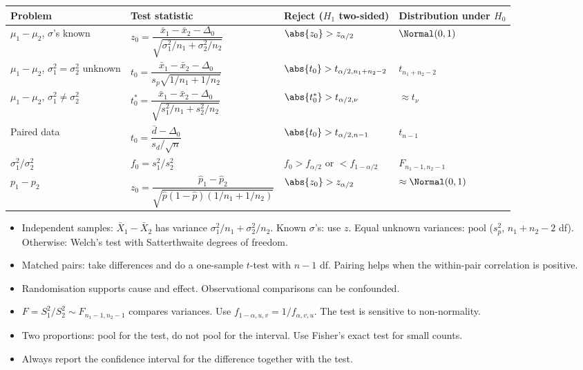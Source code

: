 \begin{center}
\small
\begin{tabular}{p{3.1cm}p{3.6cm}p{3.8cm}p{3.0cm}}
\toprule
Problem & Test statistic & Reject ($H_1$ two-sided) & Distribution under $H_0$ \\
\midrule
$\mu_1-\mu_2$, $\sigma$'s known & $z_0=\dfrac{\bar{x}_1-\bar{x}_2-\Delta_0}{\sqrt{\sigma_1^2/n_1+\sigma_2^2/n_2}}$ & $\abs{z_0}>z_{\alpha/2}$ & $\Normal(0,1)$ \\
$\mu_1-\mu_2$, $\sigma_1^2=\sigma_2^2$ unknown & $t_0=\dfrac{\bar{x}_1-\bar{x}_2-\Delta_0}{s_p\sqrt{1/n_1+1/n_2}}$ & $\abs{t_0}>t_{\alpha/2,n_1+n_2-2}$ & $t_{n_1+n_2-2}$ \\
$\mu_1-\mu_2$, $\sigma_1^2\ne\sigma_2^2$ & $t_0^*=\dfrac{\bar{x}_1-\bar{x}_2-\Delta_0}{\sqrt{s_1^2/n_1+s_2^2/n_2}}$ & $\abs{t_0^*}>t_{\alpha/2,\nu}$ & $\approx t_\nu$ \\
Paired data & $t_0=\dfrac{\bar{d}-\Delta_0}{s_d/\sqrt n}$ & $\abs{t_0}>t_{\alpha/2,n-1}$ & $t_{n-1}$ \\
$\sigma_1^2/\sigma_2^2$ & $f_0=s_1^2/s_2^2$ & $f_0>f_{\alpha/2}$ or $<f_{1-\alpha/2}$ & $F_{n_1-1,n_2-1}$ \\
$p_1-p_2$ & $z_0=\dfrac{\hat{p}_1-\hat{p}_2}{\sqrt{\hat{p}(1-\hat{p})(1/n_1+1/n_2)}}$ & $\abs{z_0}>z_{\alpha/2}$ & $\approx\Normal(0,1)$ \\
\bottomrule
\end{tabular}
\end{center}


\begin{summarybox}
\begin{itemize}
  \item Independent samples: $\bar{X}_1-\bar{X}_2$ has variance $\sigma_1^2/n_1+\sigma_2^2/n_2$. Known $\sigma$'s: use $z$. Equal unknown variances: pool ($s_p^2$, $n_1+n_2-2$ df). Otherwise: Welch's test with Satterthwaite degrees of freedom.
  \item Matched pairs: take differences and do a one-sample $t$-test with $n-1$ df. Pairing helps when the within-pair correlation is positive.
  \item Randomisation supports cause and effect. Observational comparisons can be confounded.
  \item $F=S_1^2/S_2^2\sim F_{n_1-1,n_2-1}$ compares variances. Use $f_{1-\alpha,u,v}=1/f_{\alpha,v,u}$. The test is sensitive to non-normality.
  \item Two proportions: pool for the test, do not pool for the interval. Use Fisher's exact test for small counts.
  \item Always report the confidence interval for the difference together with the test.
\end{itemize}
\end{summarybox}

